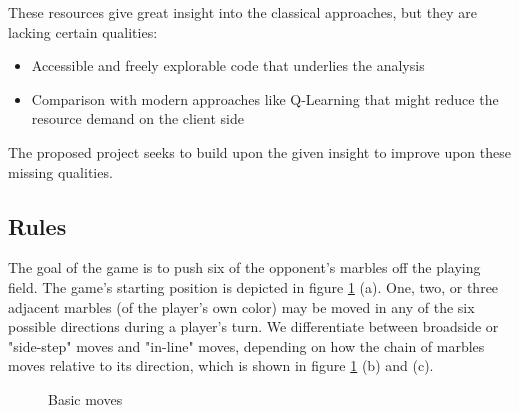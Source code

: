 \documentclass{llncs}
\begin{document}
These resources give great insight into the classical approaches, but they are lacking certain qualities:
\begin{itemize}
	\item Accessible and freely explorable code that underlies the analysis
	\item Comparison with modern approaches like Q-Learning that might reduce the resource demand on the client side
\end{itemize}

The proposed project seeks to build upon the given insight to improve upon these missing qualities.

\subsection{Rules}
The goal of the game is to push six of the opponent's marbles off the playing field. The game's starting position is depicted in figure \ref{basics} (a). One, two, or three adjacent marbles (of the player's own color) may be moved in any of the six possible directions during a player's turn. We differentiate between broadside or "side-step" moves and "in-line" moves, depending on how the chain of marbles moves relative to its direction, which is shown in figure \ref{basics} (b) and (c).

\begin{figure}[!h]
	\centering
	\hfill
	\hfill
	\caption{Basic moves \cite{abalone_sa_abalone_nodate}}
	\label{basics}
\end{figure}
\end{document}
